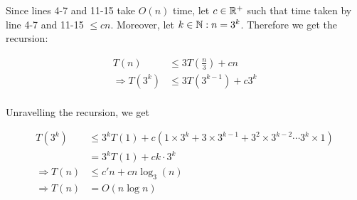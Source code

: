 Since lines 4-7 and 11-15 take $O(n)$ time, let $c \in \mathbb{R}^+$ such that time taken by line 4-7 and 11-15 $\le cn$. Moreover, let $k \in \mathbb{N}: n = 3^k$. Therefore we get the recursion:

\begin{align*}
    T(n) &\le 3 T\left(\frac{n}{3}\right) + cn \\
    \Rightarrow T(3^k) &\le 3 T(3^{k-1}) + c 3^k \\
\end{align*}

Unravelling the recursion, we get

\begin{align*}
    T(3^k) & \le 3^k T(1) + c \left(1 \times 3^k + 3 \times 3^{k-1} + 3^2 \times 3^{k-2} \cdots 3^k \times 1\right) \\
    &= 3^k T(1) + ck \cdot 3^k \\
    \Rightarrow T(n) &\le c'n + cn \log_3(n) \\
    \Rightarrow T(n) &= O(n \log n)
\end{align*}